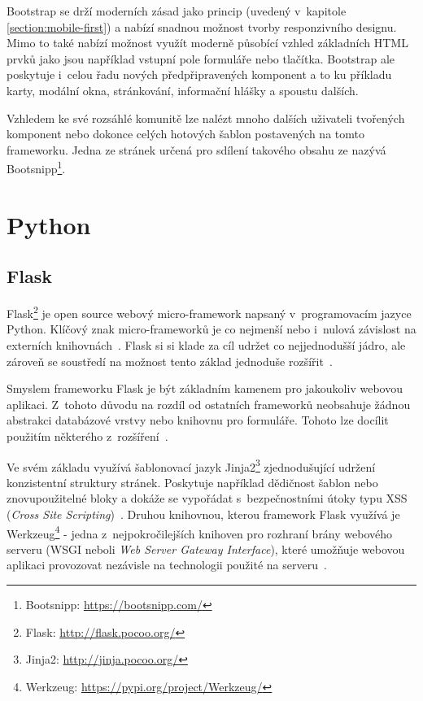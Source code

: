 Bootstrap se drží moderních zásad jako princip  (uvedený v~kapitole \ref{section:mobile-first}) a nabízí snadnou možnost tvorby responzivního designu. Mimo to také nabízí možnost využít moderně působící vzhled základních HTML prvků jako jsou například vstupní pole formuláře nebo tlačítka. Bootstrap ale poskytuje i~celou řadu nových předpřipravených komponent a to ku příkladu karty, modální okna, stránkování, informační hlášky a spoustu dalších.

Vzhledem ke své rozsáhlé komunitě lze nalézt mnoho dalších uživateli tvořených komponent nebo dokonce celých hotových šablon postavených na tomto frameworku. Jedna ze stránek určená pro sdílení takového obsahu ze nazývá Bootsnipp\footnote{Bootsnipp: \url{https://bootsnipp.com/}}.



\section{Python}
\blindtext[2]


\subsection{Flask}
Flask\footnote{Flask: \url{http://flask.pocoo.org/}} je open source webový micro-framework napsaný v~programovacím jazyce Python. Klíčový znak micro-frameworků je co nejmenší nebo i~nulová závislost na externích knihovnách~\cite{bib:flask-doc}.
Flask si si klade za cíl udržet co nejjednodušší jádro, ale zároveň se soustředí na možnost tento základ jednoduše rozšířit~\cite{bib:flask-pym}.

Smyslem frameworku Flask je být základním kamenem pro jakoukoliv webovou aplikaci. Z~tohoto důvodu na rozdíl od ostatních frameworků neobsahuje žádnou abstrakci databázové vrstvy nebo knihovnu pro formuláře. Tohoto lze docílit použitím některého z~rozšíření~\cite{bib:flask-design}.

Ve svém základu využívá šablonovací jazyk Jinja2\footnote{Jinja2: \url{http://jinja.pocoo.org/}} zjednodušující udržení konzistentní struktury stránek. Poskytuje například dědičnost šablon nebo znovupoužitelné bloky a dokáže se vypořádat s~bezpečnostními útoky typu XSS (\emph{Cross Site Scripting})~\cite{bib:jinja}.
Druhou knihovnou, kterou framework Flask využívá je Werkzeug\footnote{Werkzeug: \url{https://pypi.org/project/Werkzeug/}} - jedna z~nejpokročilejších knihoven pro rozhraní brány webového serveru (WSGI neboli \emph{Web Server Gateway Interface}), které umožňuje webovou aplikaci provozovat nezávisle na technologii použité na serveru~\cite{bib:flask-pep}.

